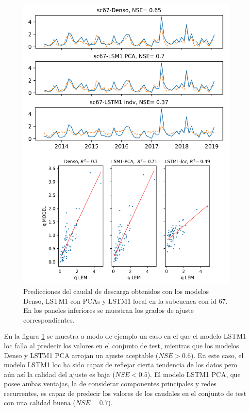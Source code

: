 \begin{figure}[h!]
  \begin{center}
    \includegraphics[height=6.in]{Figures/comp_grilla/resultados_sc67.png}
    \caption{ Predicciones del caudal de descarga obtenidos con los modelos Denso, 
    LSTM1 con PCAs y LSTM1 local en la subcuenca con id 67. En los
    paneles inferiores se muestran los grados de ajuste correspondientes.}
    \label{alcomp67}
  \end{center}
\end{figure}

En la figura \ref{alcomp67} se muestra  a modo de ejemplo un caso en el que el modelo LSTM1 loc falla 
al predecir los valores en el conjunto de test, mientras que los modelos Denso y LSTM1 PCA arrojan un ajuste aceptable
 ($NSE>0.6$). En este caso, el modelo LSTM1 loc ha sido capaz de reflejar 
cierta tendencia de los datos pero aún así la calidad del ajuste es baja ($NSE<0.5$). El modelo LSTM1 PCA, que 
posee ambas ventajas, la de considerar componentes principales y redes recurrentes, es capaz de predecir los valores de los caudales
en el conjunto de test con una calidad buena ($NSE=0.7$). 

